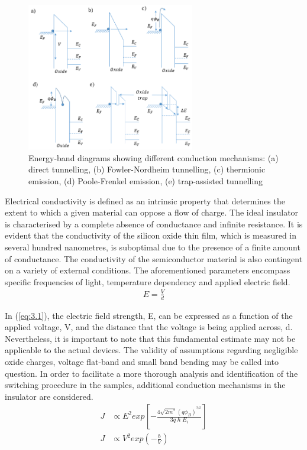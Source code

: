 \begin{figure}[htbp!] 
    \centering    
    \includegraphics[width=0.65\textwidth]{Chapter3/Figs/u.png}
    \caption[Energy-band diagrams showing different conduction mechanisms.]{Energy-band diagrams showing different conduction mechanisms: (a) direct tunnelling, (b) Fowler-Nordheim tunnelling, (c) thermionic emission, (d) Poole-Frenkel emission, (e) trap-assisted tunnelling \cite{sze2021physics}}
    \label{fig:3u}
\end{figure}

\noindent Electrical conductivity is defined as an intrinsic property that determines the extent to which a given material can oppose a flow of charge. The ideal insulator is characterised by a complete absence of conductance and infinite resistance. It is evident that the conductivity of the silicon oxide thin film, which is measured in several hundred nanometres, is suboptimal due to the presence of a finite amount of conductance. The conductivity of the semiconductor material is also contingent on a variety of external conditions. The aforementioned parameters encompass specific frequencies of light, temperature dependency and applied electric field.
\begin{align}
    E = \frac{V}{d} \label{eq:3.1}
\end{align}

\noindent In  (\ref{eq:3.1}), the electric field strength, E, can be expressed as a function of the applied voltage, V, and the distance that the voltage is being applied across, d. Nevertheless, it is important to note that this fundamental estimate may not be applicable to the actual devices. The validity of assumptions regarding negligible oxide charges, voltage flat-band and small band bending may be called into question. In order to facilitate a more thorough analysis and identification of the switching procedure in the samples, additional conduction mechanisms in the insulator are considered.
\begin{align}
    J &\propto E^{2} exp\left[ -\frac{4\sqrt{2m^{*}}(q\phi _{B})^{^{3/2}}}{3q\hslash E_{i}} \right] \label{eq:3.2} \\
    J &\propto V^2exp \left( -\frac{b}{V}\right) \label{eq:3.3}
\end{align}

